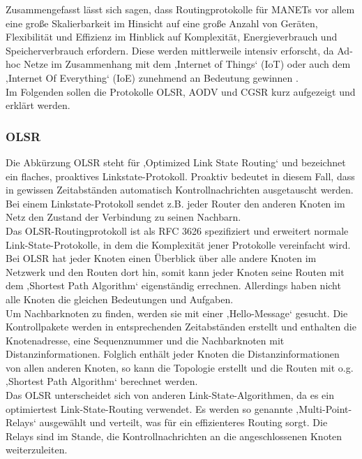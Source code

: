 Zusammengefasst lässt sich sagen, dass Routingprotokolle für MANETs vor allem eine große Skalierbarkeit im Hinsicht auf eine große Anzahl von Geräten, Flexibilität und Effizienz im Hinblick auf Komplexität, Energieverbrauch und Speicherverbrauch erfordern. Diese werden mittlerweile intensiv erforscht, da Ad-hoc Netze im Zusammenhang mit dem ‚Internet of Things‘ (IoT) oder auch dem ‚Internet Of Everything‘ (IoE) zunehmend an Bedeutung gewinnen \cite{d:timm}. \\

Im Folgenden sollen die Protokolle OLSR, AODV und CGSR kurz aufgezeigt und erklärt werden.

\subsubsection{OLSR}\label{ss:OLSR}

Die Abkürzung OLSR steht für ‚Optimized Link State Routing‘ und bezeichnet ein flaches, proaktives Linkstate-Protokoll. Proaktiv bedeutet in diesem Fall, dass in gewissen Zeitabständen automatisch Kontrollnachrichten ausgetauscht werden. Bei einem Linkstate-Protokoll sendet z.B. jeder Router den anderen Knoten im Netz den Zustand der Verbindung zu seinen Nachbarn. \\
Das OLSR-Routingprotokoll ist als RFC 3626 spezifiziert und erweitert normale Link-State-Protokolle, in dem die Komplexität jener Protokolle vereinfacht wird. \\
Bei OLSR hat jeder Knoten einen Überblick über alle andere Knoten im Netzwerk und den Routen dort hin, somit kann jeder Knoten seine Routen mit dem ‚Shortest Path Algorithm‘ eigenständig errechnen. Allerdings haben nicht alle Knoten die gleichen Bedeutungen und Aufgaben.\\
Um Nachbarknoten zu finden, werden sie mit einer ‚Hello-Message‘ gesucht. Die Kontrollpakete werden in entsprechenden Zeitabständen erstellt und enthalten die Knotenadresse, eine Sequenznummer und die Nachbarknoten mit Distanzinformationen. Folglich enthält jeder Knoten die Distanzinformationen von allen anderen Knoten, so kann die Topologie erstellt und die Routen mit o.g. ‚Shortest Path Algorithm‘ berechnet werden. \\

Das OLSR unterscheidet sich von anderen Link-State-Algorithmen, da es ein optimiertest Link-State-Routing verwendet. Es werden so genannte ‚Multi-Point-Relays‘ ausgewählt und verteilt, was für ein effizienteres Routing sorgt. Die Relays sind im Stande, die Kontrollnachrichten an die angeschlossenen Knoten weiterzuleiten.

